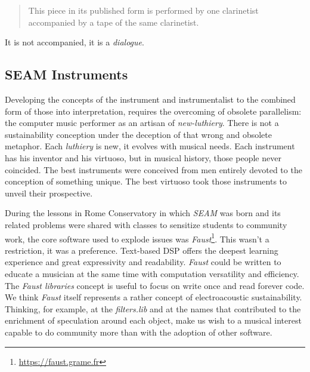 \documentclass[twoside,a4paper]{article}
\begin{document}
\begin{quote}
This piece in its published form is performed by one clarinetist accompanied by
a tape of the same clarinetist.
\end{quote}

It is not accompanied, it is a \emph{dialogue}.


\subsection{SEAM Instruments}

Developing the concepts of the instrument and instrumentalist to the combined
form of those into interpretation, \cite{lem16,mp01,savi85} requires the
overcoming of obsolete parallelism: the computer music performer as an artisan
of \emph{new-luthiery}. There is not a sustainability conception under the
deception of that wrong and obsolete metaphor. Each \emph{luthiery} is new, it
evolves with musical needs. Each instrument has his inventor and his virtuoso,
but in musical history, those people never coincided. The best instruments were
conceived from men entirely devoted to the conception of something unique. The
best virtuoso took those instruments to unveil their prospective.


During the lessons in Rome Conservatory in which \emph{SEAM} was born and its
related problems were shared with classes to sensitize students to community
work, the core software used to explode issues was
\emph{Faust}\footnote{\url{https://faust.grame.fr}}. This wasn't a restriction,
it was a preference. Text-based DSP offers the deepest learning experience and
great expressivity and readability. \emph{Faust} could be written to educate a
musician at the same time with computation versatility and efficiency. The
\emph{Faust libraries} concept is useful to focus on write once and read forever
code. We think \emph{Faust} itself represents a rather concept of electroacoustic
sustainability. Thinking, for example, at the \emph{filters.lib} and at the names
that contributed to the enrichment of speculation around each object, make us
wish to a musical interest capable to do community more than with the adoption
of other software.
\end{document}
